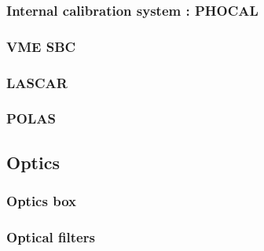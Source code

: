 \documentclass[UKenglish,texlive=2013]{\ATLASLATEXPATH atlasdoc}
\begin{document}


\subsubsection{Internal calibration system : PHOCAL}



\subsubsection{VME SBC}



\subsubsection{LASCAR}



\subsubsection{POLAS}



\subsection{Optics}

\subsubsection{Optics box}



\subsubsection{Optical filters}



\end{document}
